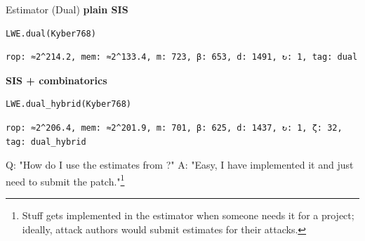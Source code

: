 \documentclass[table,10pt,aspectratio=169]{beamer}
\begin{document}
\begin{frame}[label={sec:org4a6891b},fragile]{Estimator (Dual)}
 \textbf{plain SIS}

\lstset{language=Python,label= ,caption= ,captionpos=b,numbers=none}
\begin{lstlisting}
LWE.dual(Kyber768)
\end{lstlisting}

\begin{verbatim}
rop: ≈2^214.2, mem: ≈2^133.4, m: 723, β: 653, d: 1491, ↻: 1, tag: dual
\end{verbatim}


\textbf{SIS + combinatorics}

\lstset{language=Python,label= ,caption= ,captionpos=b,numbers=none}
\begin{lstlisting}
LWE.dual_hybrid(Kyber768)
\end{lstlisting}

\begin{verbatim}
rop: ≈2^206.4, mem: ≈2^201.9, m: 701, β: 625, d: 1437, ↻: 1, ζ: 32, tag: dual_hybrid
\end{verbatim}

\begin{alertblock}{Q: "How do I use the estimates from \cite{Matzov22}?"}
A: "Easy, I have implemented it \cite{EPRINT:AlbShe22} and just need to submit the patch."\footnote{Stuff gets implemented in the estimator when someone needs it for a project; ideally, attack authors would submit estimates for their attacks.}
\end{alertblock}
\end{frame}
\end{document}
